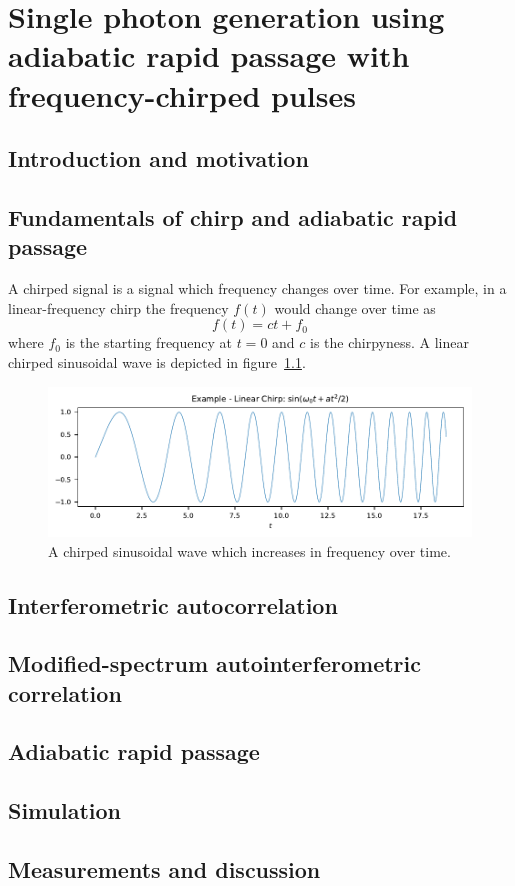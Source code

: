 \chapter{Single photon generation using adiabatic rapid passage with frequency-chirped pulses}

\section{Introduction and motivation}

\section{Fundamentals of chirp and adiabatic rapid passage}

A chirped signal is a signal which frequency changes over time.
For example, in a linear-frequency chirp the frequency $f(t)$ would change over time as
\begin{equation}
f(t) = ct+f_0
\end{equation}
where $f_0$ is the starting frequency at $t=0$ and $c$ is the chirpyness. A linear chirped sinusoidal wave is depicted in figure~\ref{fig:chirped-sin}.

\begin{figure}[H]
	\centering
	\includegraphics[width=\linewidth]{figures/chirp/chirped-sin}
	\caption{A chirped sinusoidal wave which increases in frequency over time.}
	\label{fig:chirped-sin}
\end{figure}

 
\section{Interferometric autocorrelation}

\section{Modified-spectrum autointerferometric correlation}

\section{Adiabatic rapid passage}

\section{Simulation}

\section{Measurements and discussion}